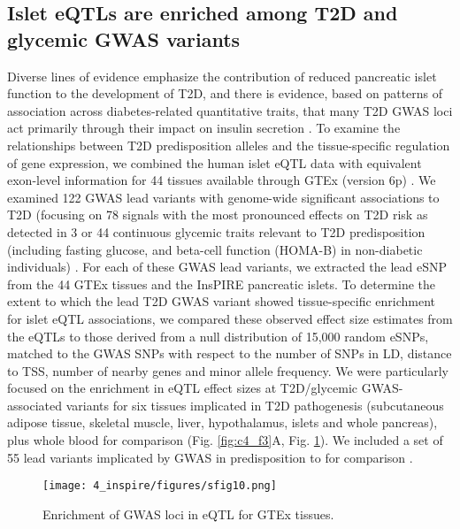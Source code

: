 \subsection{Islet eQTLs are enriched among T2D and glycemic GWAS variants}
Diverse lines of evidence emphasize the contribution of reduced pancreatic islet function to the development of T2D, and there is evidence, based on patterns of association across diabetes-related quantitative traits, that many T2D GWAS loci act primarily through their impact on insulin secretion \cite{mahajanFinemappingTypeDiabetes2018, mahajanRefiningAccuracyValidated2018, dimasImpactTypeDiabetes2014, thurnerIntegrationHumanPancreatic2018}. To examine the relationships between T2D predisposition alleles and the tissue-specific regulation of gene expression, we combined the human islet eQTL data with equivalent exon-level information for 44 tissues available through GTEx (version 6p) \cite{gtexconsortiumGeneticEffectsGene2017}.
We examined 122 GWAS lead variants with genome-wide significant associations to T2D (focusing on 78 signals with the most pronounced effects on T2D risk as detected in 3 or 44 continuous glycemic traits relevant to T2D predisposition (including fasting glucose, and beta-cell function (HOMA-B) in non-diabetic individuals) \cite{scottLargescaleAssociationAnalyses2012, manningGenomewideApproachAccounting2012, strawbridgeGenomeWideAssociationIdentifies2011}. For each of these GWAS lead variants, we extracted the lead eSNP from the 44 GTEx tissues and the InsPIRE pancreatic islets. To determine the extent to which the lead T2D GWAS variant showed tissue-specific enrichment for islet eQTL associations, we compared these observed effect size estimates from the eQTLs to those derived from a null distribution of 15,000 random eSNPs, matched to the GWAS SNPs with respect to the number of SNPs in LD, distance to TSS, number of nearby genes and minor allele frequency. We were particularly focused on the enrichment in eQTL effect sizes at T2D/glycemic GWAS-associated variants for six tissues implicated in T2D pathogenesis (subcutaneous adipose tissue, skeletal muscle, liver, hypothalamus, islets and whole pancreas), plus whole blood for comparison (Fig. \ref{fig:c4_f3}A, Fig. \ref{fig:c4_sf_gwas_eqtl_enrich}). We included a set of 55 lead variants implicated by GWAS in predisposition to  for comparison \cite{onengut-gumuscuFineMappingType2015}.

\begin{figure}
    \centering
    \texttt{[image: 4\_inspire/figures/sfig10.png]}
    \caption[Enrichment of GWAS loci in eQTL for GTEx tissues]{Enrichment of GWAS loci in eQTL for GTEx tissues.}
    \label{fig:c4_sf_gwas_eqtl_enrich}
 \end{figure}
  
